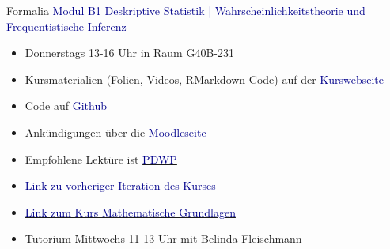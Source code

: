 \documentclass[
  8pt,
  ignorenonframetext,
]{beamer}
\providecommand{\tightlist}{%
  \setlength{\itemsep}{0pt}\setlength{\parskip}{0pt}}
\begin{document}
\begin{frame}{Formalia}
\protect\hypertarget{formalia}{}
\textcolor{darkblue}{Modul B1 Deskriptive Statistik | Wahrscheinlichkeitstheorie und Frequentistische Inferenz}

\begin{itemize}
\tightlist
\item
  \justifying Donnerstags 13-16 Uhr in Raum G40B-231
\item
  Kursmaterialien (Folien, Videos, RMarkdown Code) auf der
  \href{https://bit.ly/3yT42Sj}{\textcolor{darkblue}{Kurswebseite}}
\item
  Code auf
  \href{https://github.com/dirk-ostwald/wahrscheinlichkeitstheorie-und-frequentistische-inferenz-23}{\textcolor{darkblue}{Github}}
\item
  Ankündigungen über die
  \href{https://elearning.ovgu.de/course/view.php?id=13805}{\textcolor{darkblue}{Moodleseite}}
\item
  Empfohlene Lektüre ist
  \href{https://wasd.urz.uni-magdeburg.de/dostwald/}{\textcolor{darkblue}{PDWP}}
\item
  \href{https://bit.ly/3qJKlan}{\textcolor{darkblue}{Link zu vorheriger Iteration des Kurses}}
\item
  \href{https://bit.ly/3SNh3nR}{\textcolor{darkblue}{Link zum Kurs Mathematische Grundlagen}}
\item
  Tutorium Mittwochs 11-13 Uhr mit Belinda Fleischmann
\end{itemize}
\end{frame}
\end{document}
